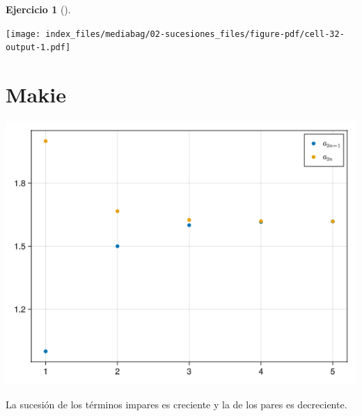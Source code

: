 \documentclass[
  a4paper,
]{scrreport}
\newenvironment{Shaded}{\begin{snugshade}}{\end{snugshade}}
\newcommand{\BuiltInTok}[1]{\textcolor[rgb]{0.00,0.23,0.31}{#1}}
\newcommand{\FloatTok}[1]{\textcolor[rgb]{0.68,0.00,0.00}{#1}}
\newcommand{\FunctionTok}[1]{\textcolor[rgb]{0.28,0.35,0.67}{#1}}
\newcommand{\ImportTok}[1]{\textcolor[rgb]{0.00,0.46,0.62}{#1}}
\newcommand{\NormalTok}[1]{\textcolor[rgb]{0.00,0.23,0.31}{#1}}
\newcommand{\OperatorTok}[1]{\textcolor[rgb]{0.37,0.37,0.37}{#1}}
\newcommand{\SpecialCharTok}[1]{\textcolor[rgb]{0.37,0.37,0.37}{#1}}
\newcommand{\StringTok}[1]{\textcolor[rgb]{0.13,0.47,0.30}{#1}}
\theoremstyle{definition}
\newtheorem{exercise}{Ejercicio}[chapter]
\theoremstyle{remark}
\begin{document}
\begin{exercise}[]
\begin{enumerate}
\begin{tcolorbox}
  \texttt{[image: index\_files/mediabag/02-sucesiones\_files/figure-pdf/cell-32-output-1.pdf]}

  \section{Makie}

\begin{Shaded}
\end{Shaded}

  \includegraphics{02-sucesiones_files/figure-pdf/cell-33-output-1.png}

  La sucesión de los términos impares es creciente y la de los pares es
  decreciente.

  \end{tcolorbox}
\end{enumerate}

\end{exercise}
\end{document}
